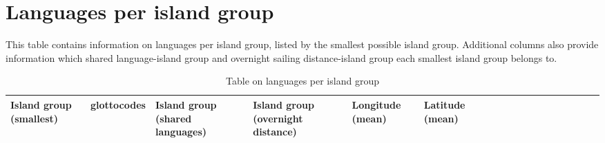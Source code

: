 \documentclass[draft,10pt]{article} %
\begin{document}
\section{Languages per island group}
\label{Subregions}
\singlespacing

This table contains information on languages per island group, listed by the smallest possible island group. Additional columns also provide information which shared language-island group and overnight sailing distance-island group each smallest island group belongs to.

\begin{landscape}
\begin{longtable}{| p{2.5cm} |  p{7cm} | p{2.5cm}  | p{2.5cm}  | p{2.5cm}  | p{2.5cm}  | p{2.5cm}  | p{2cm}  | p{1cm} | p{1cm}  | p{1cm} | p{1cm}  | p{1.5cm}  | p{1cm} | p{1cm}  | p{1cm}  |p{1cm}  | p{1cm}    |}

\caption{{Table on languages per island group}} 
\label{Subregions_table} \\
\hline
\textbf{Island group (smallest)}& \textbf{glottocodes}& \textbf{Island group (shared languages)}& \textbf{Island group (overnight distance)}& \textbf{Longitude (mean)}& \textbf{Latitude (mean)} \\ \hline
\endfirsthead


\end{longtable}
\end{landscape}
\end{document}
